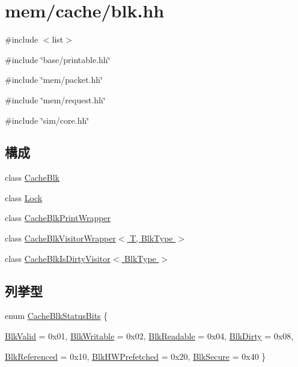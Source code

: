 \hypertarget{blk_8hh}{
\section{mem/cache/blk.hh}
\label{blk_8hh}
}
{\ttfamily \#include $<$list$>$}\par
{\ttfamily \#include \char`\"{}base/printable.hh\char`\"{}}\par
{\ttfamily \#include \char`\"{}mem/packet.hh\char`\"{}}\par
{\ttfamily \#include \char`\"{}mem/request.hh\char`\"{}}\par
{\ttfamily \#include \char`\"{}sim/core.hh\char`\"{}}\par
\subsection*{構成}
\begin{DoxyCompactItemize}
\item 
class \hyperlink{classCacheBlk}{CacheBlk}
\item 
class \hyperlink{classCacheBlk_1_1Lock}{Lock}
\item 
class \hyperlink{classCacheBlkPrintWrapper}{CacheBlkPrintWrapper}
\item 
class \hyperlink{classCacheBlkVisitorWrapper}{CacheBlkVisitorWrapper$<$ T, BlkType $>$}
\item 
class \hyperlink{classCacheBlkIsDirtyVisitor}{CacheBlkIsDirtyVisitor$<$ BlkType $>$}
\end{DoxyCompactItemize}
\subsection*{列挙型}
\begin{DoxyCompactItemize}
\item 
enum \hyperlink{blk_8hh_aba0f973471df5d3edb783ecd63fe51f7}{CacheBlkStatusBits} \{ \par
\hyperlink{blk_8hh_aba0f973471df5d3edb783ecd63fe51f7acd687680ed8ee756c990233bd44ccc7a}{BlkValid} =  0x01, 
\hyperlink{blk_8hh_aba0f973471df5d3edb783ecd63fe51f7a202d95c1090db0082a7a954856ad5358}{BlkWritable} =  0x02, 
\hyperlink{blk_8hh_aba0f973471df5d3edb783ecd63fe51f7ac413eacf0a0c4c85665e24fc3138ad50}{BlkReadable} =  0x04, 
\hyperlink{blk_8hh_aba0f973471df5d3edb783ecd63fe51f7a87715983fd384f5ee41ec0608f5c6e5f}{BlkDirty} =  0x08, 
\par
\hyperlink{blk_8hh_aba0f973471df5d3edb783ecd63fe51f7a7e0b581effa187d2825060c7b8dc714d}{BlkReferenced} =  0x10, 
\hyperlink{blk_8hh_aba0f973471df5d3edb783ecd63fe51f7aa64aeb976bf10b41a7c383f0035f753b}{BlkHWPrefetched} =  0x20, 
\hyperlink{blk_8hh_aba0f973471df5d3edb783ecd63fe51f7ae61b87ec40871a2ddb384c14fc1e46e2}{BlkSecure} =  0x40
 \}
\end{DoxyCompactItemize}


